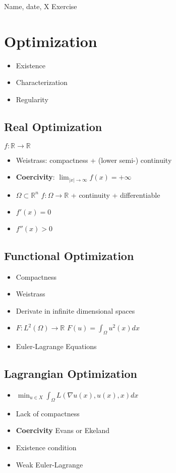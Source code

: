 \documentclass{article}
\newcommand{\REAL}{ \mathbb{R}}
\begin{document}
Name, date, X Exercise

\section{Optimization}

\begin{itemize}
\item Existence
\item Characterization
\item Regularity
\end{itemize}


\subsection{Real Optimization}
$f:\REAL \to \REAL$
\begin{itemize}
\item Weistrass: compactness + (lower semi-) continuity
\item \textbf{Coercivity}: $\lim_{|x|\to \infty} f(x)=+\infty$
\item $\Omega\subset \REAL^n$ $f:\Omega\to \REAL$ + continuity + differentiable
\item $f'(x)=0$
\item $f''(x)>0$
\end{itemize}

\subsection{Functional Optimization}
\begin{itemize}
  \item Compactness
  \item Weistrass
  \item Derivate in infinite dimensional spaces
  \item $F:L^2(\Omega)\to \REAL$ $F(u)=\int_{\Omega}u^2(x)dx$
  \item Euler-Lagrange Equations
\end{itemize}

\subsection{Lagrangian Optimization}
\begin{itemize}
  \item $\min_{u\in X} \int_{\Omega}L(\nabla u(x), u(x) ,x)dx$
\item Lack of compactness
\item \textbf{Coercivity} Evans or Ekeland
\item Existence condition
\item Weak Euler-Lagrange
\end{itemize}
\end{document}
